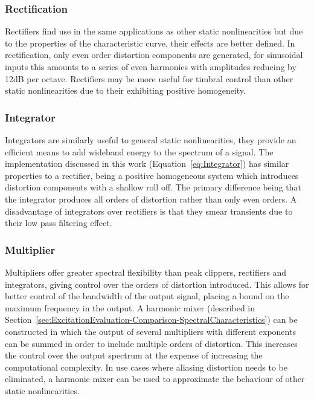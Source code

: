 		\subsubsection*{Rectification}
			Rectifiers find use in the same applications as other static nonlinearities but due to the
			properties of the characteristic curve, their effects are better defined. In rectification, only
			even order distortion components are generated, for sinusoidal inputs this amounts to a series of
			even harmonics with amplitudes reducing by 12dB per octave. Rectifiers may be more useful for
			timbral control than other static nonlinearities due to their exhibiting positive homogeneity.

		\subsubsection*{Integrator}
			Integrators are similarly useful to general static nonlinearities, they provide an efficient means
			to add wideband energy to the spectrum of a signal. The implementation discussed in this work
			(Equation~\ref{eq:Integrator}) has similar properties to a rectifier, being a positive homogeneous
			system which introduces distortion components with a shallow roll off. The primary difference being
			that the integrator produces all orders of distortion rather than only even orders. A disadvantage
			of integrators over rectifiers is that they smear transients due to their low pass filtering
			effect.

		\subsubsection*{Multiplier}
			Multipliers offer greater spectral flexibility than peak clippers, rectifiers and integrators,
			giving control over the orders of distortion introduced. This allows for better control of the
			bandwidth of the output signal, placing a bound on the maximum frequency in the output. A harmonic
			mixer (described in Section~\ref{sec:ExcitationEvaluation-Comparison-SpectralCharacteristics}) can
			be constructed in which the output of several multipliers with different exponents can be summed in
			order to include multiple orders of distortion. This increases the control over the output spectrum
			at the expense of increasing the computational complexity. In use cases where aliasing distortion
			needs to be eliminated, a harmonic mixer can be used to approximate the behaviour of other static
			nonlinearities.

